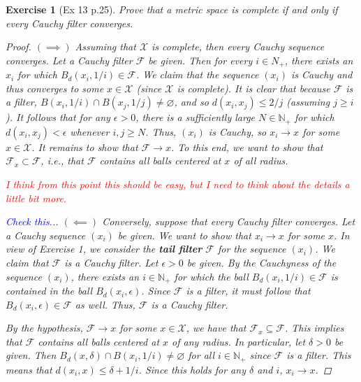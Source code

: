 \documentclass[11pt]{article}
\newtheorem{exercise}{Exercise}
\newcommand{\N}{\mathbb{N}}
\newcommand{\F}{\mathcal{F}}
\newcommand{\X}{\mathcal{X}}
\begin{document}
\begin{exercise}[Ex 13 p.25]
	Prove that a metric space is complete if and only if every Cauchy filter converges.
	\begin{proof}
		$(\implies)$ Assuming that $\X$ is complete, then every Cauchy sequence converges. Let a Cauchy filter $\F$ be given. Then for every $i\in N_+$, there exists an $ x_i$ for which $B_d(x_i,1/i)\in \F$. We claim that the sequence $(x_i)$ is Cauchy and thus converges to some $x\in \X$ (since $\X$ is complete). It is clear that because $\F$ is a filter, $B(x_i, 1/i) \cap B(x_j,1/j) \neq \varnothing$, and so $d(x_i, x_j) \leq 2/j$ (assuming $j \geq i$). It follows that for any $\epsilon > 0$, there is a sufficiently large $N\in \N_+$ for which $d(x_i,x_j) < \epsilon$ whenever $i,j \geq N$. Thus, $(x_i)$ is Cauchy, so $x_i \to x$ for some $x\in \X$. It remains to show that $\F \to x$. To this end, we want to show that $\F_x \subset \F$, i.e., that $\F$ contains all balls centered at $x$ of all radius.  
		
		
		\textcolor{red}{I think from this point this should be easy, but I need to think about the details a little bit more.}
		
		
		\textcolor{blue}{Check this...} $(\impliedby)$ Conversely, suppose that every Cauchy filter converges. Let a Cauchy sequence $(x_i)$ be given. We want to show that $x_i\to x$ for some $x$. In view of Exercise 1, we consider the \textbf{tail filter} $\F$ for the sequence $(x_i)$. We claim that $\F$ is a Cauchy filter. Let $\epsilon > 0$ be given. By the Cauchyness of the sequence $(x_i)$, there exists an $i\in \N_+$ for which the ball $B_d(x_i,1/i) \in \F$ is contained in the ball $B_d(x_i,\epsilon)$. Since $\F$ is a filter, it must follow that $B_d(x_i,\epsilon) \in \F$ as well. Thus, $\F$ is a Cauchy filter. 
		
		By the hypothesis, $\F \to x$ for some $x\in \X$, we have that $\F_x\subseteq \F$. This implies that $\F$ contains all balls centered at $x$ of any radius. In particular, let $\delta > 0$ be given. Then $B_d(x,\delta)\cap B(x_i,1/i) \neq \varnothing$ for all $i\in \N_+$ since $\F$ is a filter. This means that $d(x_i,x) \leq \delta+ 1/i$. Since this holds for any $\delta$ and $i$, $x_i \to x$.  
		
		
 	\end{proof}
\end{exercise}
\end{document}
